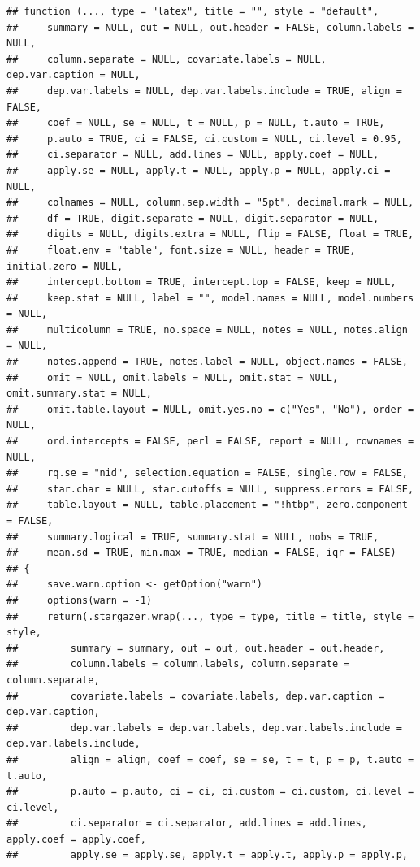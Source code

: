 \documentclass[]{elsarticle} %
\begin{document}
\begin{verbatim}
## function (..., type = "latex", title = "", style = "default", 
##     summary = NULL, out = NULL, out.header = FALSE, column.labels = NULL, 
##     column.separate = NULL, covariate.labels = NULL, dep.var.caption = NULL, 
##     dep.var.labels = NULL, dep.var.labels.include = TRUE, align = FALSE, 
##     coef = NULL, se = NULL, t = NULL, p = NULL, t.auto = TRUE, 
##     p.auto = TRUE, ci = FALSE, ci.custom = NULL, ci.level = 0.95, 
##     ci.separator = NULL, add.lines = NULL, apply.coef = NULL, 
##     apply.se = NULL, apply.t = NULL, apply.p = NULL, apply.ci = NULL, 
##     colnames = NULL, column.sep.width = "5pt", decimal.mark = NULL, 
##     df = TRUE, digit.separate = NULL, digit.separator = NULL, 
##     digits = NULL, digits.extra = NULL, flip = FALSE, float = TRUE, 
##     float.env = "table", font.size = NULL, header = TRUE, initial.zero = NULL, 
##     intercept.bottom = TRUE, intercept.top = FALSE, keep = NULL, 
##     keep.stat = NULL, label = "", model.names = NULL, model.numbers = NULL, 
##     multicolumn = TRUE, no.space = NULL, notes = NULL, notes.align = NULL, 
##     notes.append = TRUE, notes.label = NULL, object.names = FALSE, 
##     omit = NULL, omit.labels = NULL, omit.stat = NULL, omit.summary.stat = NULL, 
##     omit.table.layout = NULL, omit.yes.no = c("Yes", "No"), order = NULL, 
##     ord.intercepts = FALSE, perl = FALSE, report = NULL, rownames = NULL, 
##     rq.se = "nid", selection.equation = FALSE, single.row = FALSE, 
##     star.char = NULL, star.cutoffs = NULL, suppress.errors = FALSE, 
##     table.layout = NULL, table.placement = "!htbp", zero.component = FALSE, 
##     summary.logical = TRUE, summary.stat = NULL, nobs = TRUE, 
##     mean.sd = TRUE, min.max = TRUE, median = FALSE, iqr = FALSE) 
## {
##     save.warn.option <- getOption("warn")
##     options(warn = -1)
##     return(.stargazer.wrap(..., type = type, title = title, style = style, 
##         summary = summary, out = out, out.header = out.header, 
##         column.labels = column.labels, column.separate = column.separate, 
##         covariate.labels = covariate.labels, dep.var.caption = dep.var.caption, 
##         dep.var.labels = dep.var.labels, dep.var.labels.include = dep.var.labels.include, 
##         align = align, coef = coef, se = se, t = t, p = p, t.auto = t.auto, 
##         p.auto = p.auto, ci = ci, ci.custom = ci.custom, ci.level = ci.level, 
##         ci.separator = ci.separator, add.lines = add.lines, apply.coef = apply.coef, 
##         apply.se = apply.se, apply.t = apply.t, apply.p = apply.p, 

\end{verbatim}
\end{document}
